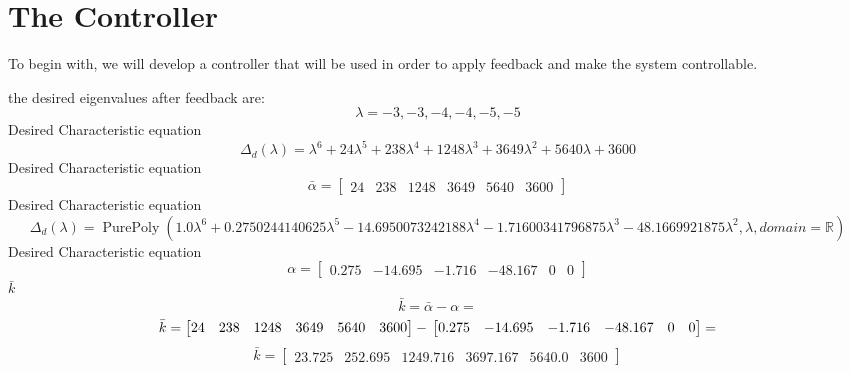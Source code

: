 \section{The Controller}
To begin with, we will develop a controller that will be used in order to apply feedback and make the system
controllable.

the desired eigenvalues after feedback are: 
\begin{equation}
\lambda = -3, -3, -4, -4, -5, -5
\end{equation}
Desired Characteristic equation
\begin{equation}
\Delta_d(\lambda) = \lambda^{6} + 24 \lambda^{5} + 238 \lambda^{4} + 1248 \lambda^{3} + 3649 \lambda^{2} + 5640 \lambda + 3600
\end{equation}
Desired Characteristic equation
\begin{equation}
\bar \alpha = \left[\begin{matrix}24 & 238 & 1248 & 3649 & 5640 & 3600\end{matrix}\right]
\end{equation}
Desired Characteristic equation
\begin{equation}
\Delta_d(\lambda) = \operatorname{PurePoly}{\left( 1.0 \lambda^{6} + 0.2750244140625 \lambda^{5} - 14.6950073242188 \lambda^{4} - 1.71600341796875 \lambda^{3} - 48.1669921875 \lambda^{2}, \lambda, domain=\mathbb{R} \right)}
\end{equation}
Desired Characteristic equation
\begin{equation}
\alpha = \left[\begin{matrix}0.275 & -14.695 & -1.716 & -48.167 & 0 & 0\end{matrix}\right]
\end{equation}
$\bar k$
\begin{equation}
  \bar k = \bar \alpha - \alpha = 
\end{equation}
\begin{equation}
  \bar k = \left[\begin{matrix}24 & 238 & 1248 & 3649 & 5640 & 3600\end{matrix}\right] - \\\left[\begin{matrix}0.275 & -14.695 & -1.716 & -48.167 & 0 & 0\end{matrix}\right] = 
\end{equation}
\begin{equation}
  \bar k = \left[\begin{matrix}23.725 & 252.695 & 1249.716 & 3697.167 & 5640.0 & 3600\end{matrix}\right]
\end{equation}
